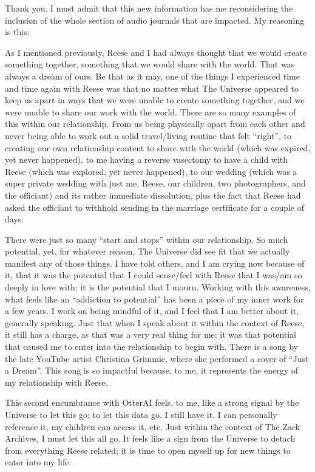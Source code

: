 \documentclass{article}
\begin{document}
Thank you. I must admit that this new information has me reconsidering
the inclusion of the whole section of audio journals that are impacted.
My reasoning is this:

As I mentioned previously, Reese and I had always thought that we would
create something together, something that we would share with the world.
That was always a dream of ours. Be that as it may, one of the things I
experienced time and time again with Reese was that no matter what The
Universe appeared to keep us apart in ways that we were unable to create
something together, and we were unable to share our work with the world.
There are so many examples of this within our relationship. From us
being physically apart from each other and never being able to work out
a solid travel/living routine that felt ``right'', to creating our own
relationship content to share with the world (which was expired, yet
never happened), to me having a reverse vasectomy to have a child with
Reese (which was explored, yet never happened), to our wedding (which
was a super private wedding with just me, Reese, our children, two
photographers, and the officiant) and its rather immediate dissolution,
plus the fact that Reese had asked the officiant to withhold sending in
the marriage certificate for a couple of days.

There were just so many ``start and stops'' within our relationship. So
much potential, yet, for whatever reason, The Universe did see fit that
we actually manifest any of those things. I have told others, and I am
crying now because of it, that it was the potential that I could
sense/feel with Reese that I was/am so deeply in love with; it is the
potential that I mourn. Working with this awareness, what feels like an
``addiction to potential'' has been a piece of my inner work for a few
years. I work on being mindful of it, and I feel that I am better about
it, generally speaking. Just that when I speak about it within the
context of Reese, it still has a charge, as that was a very real thing
for me; it was that potential that caused me to enter into the
relationship to begin with. There is a song by the late YouTube artist
Christina Grimmie, where she performed a cover of ``Just a Dream''. This
song is so impactful because, to me, it represents the energy of my
relationship with Reese.

This second encumbrance with OtterAI feels, to me, like a strong signal
by the Universe to let this go; to let this data go. I still have it. I
can personally reference it, my children can access it, etc. Just within
the context of The Zack Archives, I must let this all go. It feels like
a sign from the Universe to detach from everything Reese related; it is
time to open myself up for new things to enter into my life.
\end{document}
